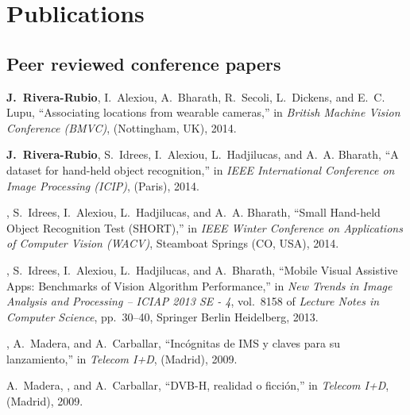 \section{Publications}


\subsection{Peer reviewed conference papers}

\begin{thebibliography}{3}

\textbf{J.~Rivera-Rubio}, I.~Alexiou, A.~Bharath, R.~Secoli, L.~Dickens, and E.~C. Lupu,
  ``{Associating locations from wearable cameras},'' in {\em British Machine
  Vision Conference (BMVC)}, (Nottingham, UK), 2014.


\textbf{J.~Rivera-Rubio}, S.~Idrees, I.~Alexiou, L.~Hadjilucas, and A.~A. Bharath, ``{A
  dataset for hand-held object recognition},'' in {\em IEEE International
  Conference on Image Processing (ICIP)}, (Paris), 2014.

, S.~Idrees, I.~Alexiou, L.~Hadjilucas, and A.~A. Bharath,
  ``{Small Hand-held Object Recognition Test (SHORT)},'' in {\em IEEE Winter
  Conference on Applications of Computer Vision (WACV)}, Steamboat Springs
  (CO, USA), 2014.

, S.~Idrees, I.~Alexiou, L.~Hadjilucas, and A.~Bharath,
  ``{Mobile Visual Assistive Apps: Benchmarks of Vision Algorithm
  Performance},'' in {\em New Trends in Image Analysis and Processing -- ICIAP
  2013 SE - 4}, vol.~8158 of {\em Lecture Notes in Computer Science},
  pp.~30--40, Springer Berlin Heidelberg, 2013.

, A.~Madera, and A.~Carballar, ``{Inc\'{o}gnitas de IMS y claves
  para su lanzamiento},'' in {\em Telecom I+D}, (Madrid), 2009.

A.~Madera, , and A.~Carballar, ``{DVB-H, realidad o
  ficci\'{o}n},'' in {\em Telecom I+D}, (Madrid), 2009.
  
\end{thebibliography}

